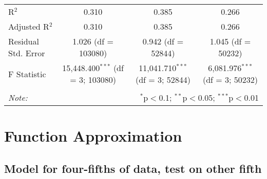 \documentclass{article}\usepackage[]{graphicx}\usepackage[]{color}
\begin{document}
\begin{table}[!htbp]
\begin{adjustbox}{max width=\textwidth}
\begin{tabular}{@{\extracolsep{5pt}}lccc}
R$^{2}$ & 0.310 & 0.385 & 0.266 \\
Adjusted R$^{2}$ & 0.310 & 0.385 & 0.266 \\
Residual Std. Error & 1.026 (df = 103080) & 0.942 (df = 52844) & 1.045 (df = 50232) \\
F Statistic & 15,448.400$^{***}$ (df = 3; 103080) & 11,041.710$^{***}$ (df = 3; 52844) & 6,081.976$^{***}$ (df = 3; 50232) \\
\hline
\hline \\[-1.8ex]
\textit{Note:} & \multicolumn{3}{r}{$^{*}$p$<$0.1; $^{**}$p$<$0.05; $^{***}$p$<$0.01} \\
\end{tabular}
\end{adjustbox}
\end{table}

\vspace{100ex}

\section{Function Approximation}
\subsection{Model for four-fifths of data, test on other fifth}
\end{document}
